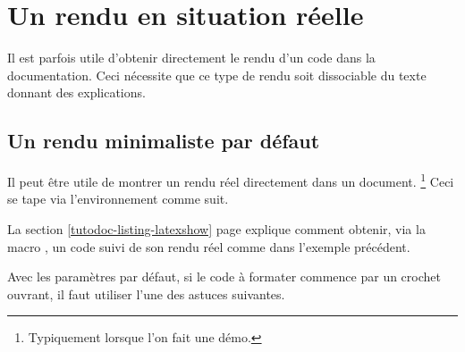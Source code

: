 \documentclass{tutodoc}
\begin{document}
\section{Un rendu en situation réelle}
\label{tutodoc-showcase}

Il est parfois utile d'obtenir directement le rendu d'un code dans la documentation. Ceci nécessite que ce type de rendu soit dissociable du texte donnant des explications.



\subsection{Un rendu minimaliste par défaut}

\begin{tdocexa}
    Il peut être utile de montrer un rendu réel directement dans un document.%
    \footnote{
        Typiquement lorsque l'on fait une démo.
    }
    Ceci se tape via l'environnement  comme suit.

\end{tdocexa}


\begin{tdocrem}
    La section \ref{tutodoc-listing-latexshow} page \pageref{tutodoc-listing-latexshow} explique comment obtenir, via la macro , un code suivi de son rendu réel comme dans l'exemple précédent.
\end{tdocrem}


\begin{tdocwarn}
    Avec les paramètres par défaut, si le code à formater commence par un crochet ouvrant, il faut utiliser l'une des astuces suivantes.

\end{tdocwarn}
\end{document}
